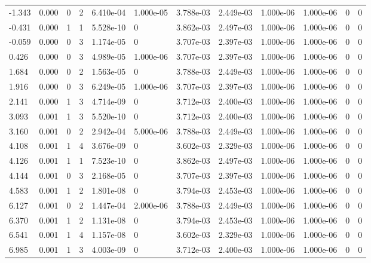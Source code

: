 \documentclass[preview]{standalone}
\begin{document}
{{\begin{tabular}{L{1.2cm}C{1.2cm} C{0.3cm}C{0.5cm} C{1.4cm}C{1.4cm} C{1.4cm}C{1.4cm} C{1.6cm}C{1.6cm} C{1.6cm}C{1.6cm}}
  -1.343  &  0.000  & 0     &  2 &  6.410e-04  & 1.000e-05  &  3.788e-03&   2.449e-03& 1.000e-06 & 1.000e-06   &  0 & 0  \\ 
  -0.431  &  0.000  & 1     &  1 &  5.528e-10  & 0  &  3.862e-03&   2.497e-03& 1.000e-06 & 1.000e-06   &  0 & 0  \\ 
  -0.059  &  0.000  & 0     &  3 &  1.174e-05  & 0  &  3.707e-03&   2.397e-03& 1.000e-06 & 1.000e-06   &  0 & 0  \\ 
  0.426  &  0.000  & 0     &  3 &  4.989e-05  & 1.000e-06  &  3.707e-03&   2.397e-03& 1.000e-06 & 1.000e-06   &  0 & 0  \\ 
  1.684  &  0.000  & 0     &  2 &  1.563e-05  & 0  &  3.788e-03&   2.449e-03& 1.000e-06 & 1.000e-06   &  0 & 0  \\ 
  1.916  &  0.000  & 0     &  3 &  6.249e-05  & 1.000e-06  &  3.707e-03&   2.397e-03& 1.000e-06 & 1.000e-06   &  0 & 0  \\ 
  2.141  &  0.000  & 1     &  3 &  4.714e-09  & 0  &  3.712e-03&   2.400e-03& 1.000e-06 & 1.000e-06   &  0 & 0  \\ 
  3.093  &  0.001  & 1     &  3 &  5.520e-10  & 0  &  3.712e-03&   2.400e-03& 1.000e-06 & 1.000e-06   &  0 & 0  \\ 
  3.160  &  0.001  & 0     &  2 &  2.942e-04  & 5.000e-06  &  3.788e-03&   2.449e-03& 1.000e-06 & 1.000e-06   &  0 & 0  \\ 
  4.108  &  0.001  & 1     &  4 &  3.676e-09  & 0  &  3.602e-03&   2.329e-03& 1.000e-06 & 1.000e-06   &  0 & 0  \\ 
  4.126  &  0.001  & 1     &  1 &  7.523e-10  & 0  &  3.862e-03&   2.497e-03& 1.000e-06 & 1.000e-06   &  0 & 0  \\ 
  4.144  &  0.001  & 0     &  3 &  2.168e-05  & 0  &  3.707e-03&   2.397e-03& 1.000e-06 & 1.000e-06   &  0 & 0  \\ 
  4.583  &  0.001  & 1     &  2 &  1.801e-08  & 0  &  3.794e-03&   2.453e-03& 1.000e-06 & 1.000e-06   &  0 & 0  \\ 
  6.127  &  0.001  & 0     &  2 &  1.447e-04  & 2.000e-06  &  3.788e-03&   2.449e-03& 1.000e-06 & 1.000e-06   &  0 & 0  \\ 
  6.370  &  0.001  & 1     &  2 &  1.131e-08  & 0  &  3.794e-03&   2.453e-03& 1.000e-06 & 1.000e-06   &  0 & 0  \\ 
  6.541  &  0.001  & 1     &  4 &  1.157e-08  & 0  &  3.602e-03&   2.329e-03& 1.000e-06 & 1.000e-06   &  0 & 0  \\ 
  6.985  &  0.001  & 1     &  3 &  4.003e-09  & 0  &  3.712e-03&   2.400e-03& 1.000e-06 & 1.000e-06   &  0 & 0  \\ 

\end{tabular}}}
\end{document}
